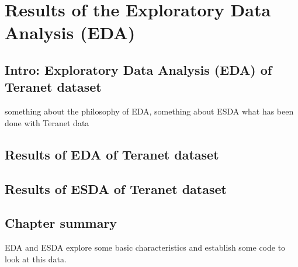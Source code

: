 \chapter{Results of the Exploratory Data Analysis (EDA)} \label{ch:eda_results}

\section{Intro: Exploratory Data Analysis (EDA) of Teranet dataset} \label{sec:eda}

something about the philosophy of EDA,
something about ESDA
what has been done with Teranet data

\section{Results of EDA of Teranet dataset} \label{sec:eda_results_teranet}


\section{Results of ESDA of Teranet dataset} \label{sec:esda_results_teranet}


\section{Chapter summary} \label{sec:eda_summary}
EDA and ESDA explore some basic characteristics and establish some code to look at this data.
